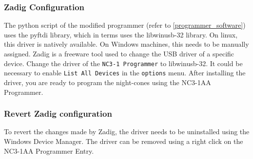 \subsubsection{Zadig Configuration}
The python script of the modified programmer (refer to \ref{programmer_software}) uses the pyftdi library, which in terms uses the libwinusb-32 library. On linux, this driver is natively available. On Windows machines, this needs to be manually assigned. Zadig\cite{zadig} is a freeware tool used to change the \ac{USB} driver of a specific device. Change the driver of the \texttt{NC3-1 Programmer} to libwinusb-32. It could be necessary to enable \texttt{List All Devices} in the \texttt{options} menu. After installing the driver, you are ready to program the night-cones using the NC3-1AA Programmer. 

\subsubsection{Revert Zadig configuration}
To revert the changes made by Zadig, the driver needs to be uninstalled using the Windows Device Manager. The driver can be removed using a right click on the NC3-1AA Programmer Entry. 

\FloatBarrier


